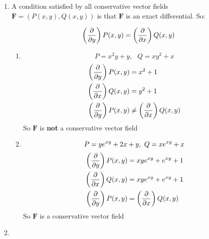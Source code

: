 \documentclass[10pt,\jkfside,a4paper]{article}
\begin{document}
\begin{enumerate}
\begin{enumerate}[label=(\roman*)]
\begin{enumerate}[label=(\alph*)]
\end{enumerate}

\end{enumerate}

\item 

A condition satisfied by all conservative vector fields $\mathbf{F} = (P(x, y), Q(x, y))$ is that 
$\mathbf{F}$ is an exact differential. So:

\begin{equation}
\left(\pdv{y}\right)P(x, y) = \left(\pdv{x}\right)Q(x, y)
\end{equation}

\begin{enumerate}

\item

\begin{equation}
P = x^2y + y, \text{   } Q = xy^2 + x 
\end{equation}
\begin{equation}
\begin{split}
\left(\pdv{y}\right)P(x, y) &= x^2 + 1 \\
\left(\pdv{x}\right)Q(x, y) &= y^2 + 1 \\
\left(\pdv{y}\right)P(x, y) &\neq \left(\pdv{x}\right)Q(x, y) \\
\end{split}
\end{equation}
So $\mathbf{F}$ is \textbf{not} a conservative vector field

\item
\begin{equation}
P = ye^{xy} + 2x + y, \text{   } Q = xe^{xy} + x \\
\end{equation}
\begin{equation}
\begin{split}
\left(\pdv{y}\right)P(x, y) &= xye^{xy} + e^{xy} + 1 \\
\left(\pdv{x}\right)Q(x, y) &= xye^{xy} + e^{xy} + 1 \\
\left(\pdv{y}\right)P(x, y) &= \left(\pdv{x}\right)Q(x, y) \\
\end{split}
\end{equation}
So $\mathbf{F}$ is a conservative vector field

\end{enumerate}

\item 
\begin{enumerate}[label=(\roman*)]


\end{enumerate}
\end{enumerate}
\end{document}
